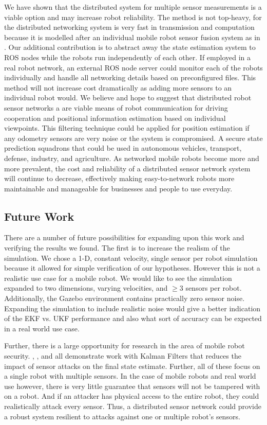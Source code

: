 \documentclass[conference]{IEEEtran} \usepackage[T1]{fontenc} \usepackage[backend=biber, style=ieee]{biblatex}
\begin{document}
We have shown that the distributed system for multiple sensor measurements is a viable option and may increase robot reliability. The method is not top-heavy, 
for the distributed networking system is very fast in transmission and computation because it is modelled after an individual mobile robot sensor fusion system as 
in \cite{bezzo2014attack}. Our additional contribution is to abstract away the state estimation system to ROS nodes while the robots run independently of each other. If employed in 
a real robot network, an external ROS node server could monitor each of the robots individually and handle all networking details based on preconfigured files. 
This method will not increase cost dramatically as adding more sensors to an individual robot would. We believe and hope to suggest that distributed robot sensor 
networks a are viable means of robot communication for driving cooperation and positional information estimation based on individual viewpoints. This filtering 
technique could be applied for position estimation if any odometry sensors are very noise or the system is compromised. A  secure state prediction squadrons that 
could be used in autonomous vehicles, transport, defense, industry, and agriculture. As networked mobile robots become more and more prevalent, the cost and 
reliability of a distributed sensor network system will continue to decrease, effectively making easy-to-network robots more maintainable and manageable for 
businesses and people to use everyday.

\subsection{Future Work}
There are a number of future possibilities for expanding upon this work and verifying the results we found. The first is to increase the realism of the simulation. We chose a 1-D, constant velocity, single sensor per robot simulation because it allowed for simple verification of our hypotheses. However this is not a realistic use case for a mobile robot. We would like to see the simulation expanded to two dimensions, varying velocities, and $\geq 3$ sensors per robot. Additionally, the Gazebo environment contains practically zero sensor noise. Expanding the simulation to include realistic noise would give a better indication of the EKF vs. UKF performance and also what sort of accuracy can be expected in a real world use case.

Further, there is a large opportunity for research in the area of mobile robot security. \cite{bezzo2014attack}, \cite{fawzi2011secure}, and \cite{mo2014resilient} all demonstrate work with Kalman Filters that reduces the impact of sensor attacks on the final state estimate. Further, all of these focus on a single robot with multiple sensors. In the case of mobile robots and real world use however, there is very little guarantee that sensors will not be tampered with on a robot. And if an attacker has physical access to the entire robot, they could realistically attack every sensor. Thus, a distributed sensor network could provide a robust system resilient to attacks against one or multiple robot's sensors. 

\printbibliography
\end{document}
